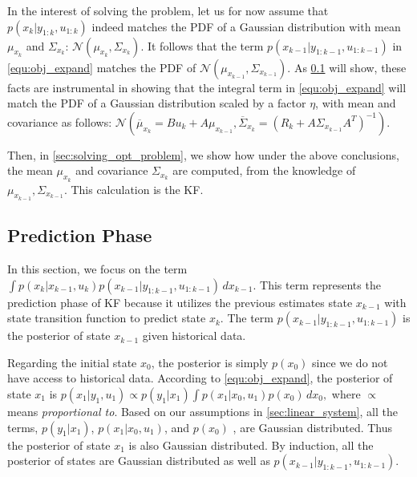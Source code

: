 In the interest of solving the problem, let us for now assume that $p(x_k|y_{1:k},u_{1:k})$ indeed matches the PDF of a Gaussian distribution with mean $\mu_{x_{k}}$ and $\Sigma_{x_{k}}$:
$\mathcal{N}(\mu_{x_{k}}, \Sigma_{x_{k}})$.
It follows that the term $p(x_{k-1}|y_{1:k-1},u_{1:k-1})$ in \cref{equ:obj_expand} matches the PDF of $\mathcal{N}(\mu_{x_{k-1}}, \Sigma_{x_{k-1}})$.
As \cref{sec:prediction_phase} will show, these facts are instrumental in showing that the integral term in \cref{equ:obj_expand} will match the PDF of a Gaussian distribution scaled by a factor $\eta$, with mean and covariance as follows: $ \mathcal{N}( \overline{\mu}_{x_k}=Bu_k + A\mu_{x_{k-1}} , \overline{\Sigma}_{x_k} = (R_k + A\Sigma_{x_{k-1}}A^T)^{-1})$.

Then, in \cref{sec:solving_opt_problem}, we show how under the above conclusions, the mean $\mu_{x_{k}}$ and covariance $\Sigma_{x_{k}}$ are computed, from the knowledge of $\mu_{x_{k-1}}, \Sigma_{x_{k-1}}$.
This calculation is the KF.

\subsection{Prediction Phase} \label{sec:prediction_phase} 

In this section, we focus on the term 
$\int p(x_k|x_{k-1},u_{k})p(x_{k-1}|y_{1:k-1},u_{1:k-1}) \,dx_{k-1}$.  
This term represents the prediction phase of KF because it utilizes the previous estimates state $x_{k-1}$ with state transition function to predict state $x_{k}$.
The term $p(x_{k-1}|y_{1:k-1},u_{1:k-1})$ is the posterior of state $x_{k-1}$ given historical data.

Regarding the initial state $x_0$, the posterior is simply $p(x_0)$ since we do not have access to historical data. According to \cref{equ:obj_expand}, 
the posterior of state $x_1$ is 
$
		p(x_1|y_1,u_{1}) \propto p(y_1|x_1)\int p(x_1|x_{0},u_{1})p(x_{0}) \,dx_{0},
$
where $\propto$ means \emph{proportional to}.
Based on our assumptions in \cref{sec:linear_system}, all the terms, $ p(y_1|x_1)$, $ p(x_1|x_{0},u_{1})$, and $p(x_{0})$ , are Gaussian distributed. 
Thus the posterior of state $x_1$ is also Gaussian distributed. 
By induction, all the posterior of states are Gaussian distributed as well as $p(x_{k-1}|y_{1:k-1},u_{1:k-1})$.


